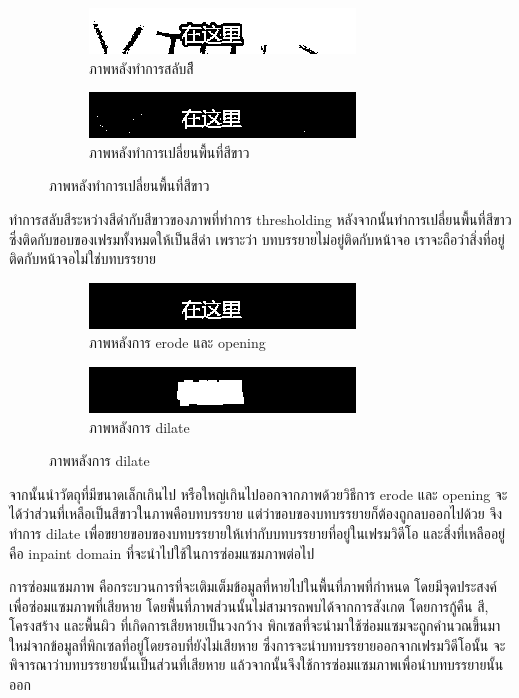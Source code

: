 \documentclass[hidelinks,a4paper,14pt]{article}
\numberwithin{equation}{section}							%
\begin{document}
{\begin{figure}[H]
	\begin{subfigure}{0.4\linewidth}
		\centering
		\includegraphics[width=0.4\linewidth]{images/detection-inverse.png}
		\caption{ภาพหลังทำการสลับสีี}
	\end{subfigure}
	\begin{subfigure}{0.4\linewidth}
		\centering
		\includegraphics[width=0.4\linewidth]{images/detection-blackfill.png}
		\caption{ภาพหลังทำการเปลี่ยนพื้นที่สีขาว}
	\end{subfigure}
\end{figure}

ทำการสลับสีระหว่างสีดำกับสีขาวของภาพที่ทำการ thresholding หลังจากนั้นทำการเปลี่ยนพื้นที่สีขาวซึ่งติดกับขอบของเฟรมทั้งหมดให้เป็นสีดำ เพราะว่า บทบรรยายไม่อยู่ติดกับหน้าจอ เราจะถือว่าสิ่งที่อยู่ติดกับหน้าจอไม่ใช่บทบรรยาย

\begin{figure}[H]
	\begin{subfigure}{0.4\linewidth}
		\centering
		\includegraphics[width=0.4\linewidth]{images/detection-erode-opening.png}
		\caption{ภาพหลังการ erode และ opening}
	\end{subfigure}
	\begin{subfigure}{0.4\linewidth}
		\centering
		\includegraphics[width=0.4\linewidth]{images/detection-stoke.png}
		\caption{ภาพหลังการ dilate}
	\end{subfigure}
\end{figure}

จากนั้นนำวัตถุที่มีขนาดเล็กเกินไป หรือใหญ่เกินไปออกจากภาพด้วยวิธีการ erode และ opening
จะได้ว่าส่วนที่เหลือเป็นสีขาวในภาพคือบทบรรยาย แต่ว่าขอบของบทบรรยายก็ต้องถูกลบออกไปด้วย จึงทำการ dilate เพื่อขยายขอบของบทบรรยายให้เท่ากับบทบรรยายที่อยู่ในเฟรมวิดีโอ และสิ่งที่เหลืออยู่คือ inpaint domain ที่จะนำไปใช้ในการซ่อมแซมภาพต่อไป
	
	การซ่อมแซมภาพ คือกระบวนการที่จะเติมเต็มข้อมูลที่หายไปในพื้นที่ภาพที่กำหนด โดยมีจุดประสงค์เพื่อซ่อมแซมภาพที่เสียหาย โดยพื้นที่ภาพส่วนนั้นไม่สามารถพบได้จากการสังเกต โดยการกู้คืน สี, โครงสร้าง และพื้นผิว ที่เกิดการเสียหายเป็นวงกว้าง พิกเซลที่จะนำมาใช้ซ่อมแซมจะถูกคำนวณขึ้นมาใหม่จากข้อมูลที่พิกเซลที่อยู่โดยรอบที่ยังไม่เสียหาย ซึ่งการจะนำบทบรรยายออกจากเฟรมวิดีโอนั้น จะพิจารณาว่าบทบรรยายนั้นเป็นส่วนที่เสียหาย แล้วจากนั้นจึงใช้การซ่อมแซมภาพเพื่อนำบทบรรยายนั้นออก\newline
	
}
\end{document}
